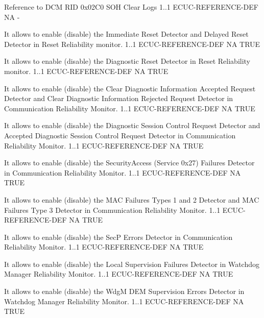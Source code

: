 {
{Reference to DCM RID 0x02C0 SOH Clear Logs}
{1..1}
{ECUC-REFERENCE-DEF}
{NA}
{-}
\label{sec:confparamautosar}

{
{It allows to enable (disable) the Immediate Reset Detector and Delayed Reset Detector in Reset Reliability monitor.}
{1..1}
{ECUC-REFERENCE-DEF}
{NA}
{TRUE}

{
{It allows to enable (disable) the Diagnostic Reset Detector in Reset Reliability monitor.}
{1..1}
{ECUC-REFERENCE-DEF}
{NA}
{TRUE}

{
{It allows to enable (disable) the Clear Diagnostic Information Accepted Request Detector and Clear Diagnostic Information Rejected Request Detector in Communication Reliability Monitor.}
{1..1}
{ECUC-REFERENCE-DEF}
{NA}
{TRUE}

{
{It allows to enable (disable) the Diagnostic Session Control Request Detector and Accepted Diagnostic Session Control Request Detector in Communication Reliability Monitor.}
{1..1}
{ECUC-REFERENCE-DEF}
{NA}
{TRUE}

{
{It allows to enable (disable) the SecurityAccess (Service 0x27) Failures Detector in Communication Reliability Monitor.}
{1..1}
{ECUC-REFERENCE-DEF}
{NA}
{TRUE}

{
{It allows to enable (disable) the MAC Failures Types 1 and 2 Detector and MAC Failures Type 3 Detector in Communication Reliability Monitor.}
{1..1}
{ECUC-REFERENCE-DEF}
{NA}
{TRUE}

{
{It allows to enable (disable) the SecP Errors Detector in Communication Reliability Monitor.}
{1..1}
{ECUC-REFERENCE-DEF}
{NA}
{TRUE}

{
{It allows to enable (disable) the Local Supervision Failures Detector in Watchdog Manager Reliability Monitor. }
{1..1}
{ECUC-REFERENCE-DEF}
{NA}
{TRUE}

{
{It allows to enable (disable) the WdgM DEM Supervision Errors Detector in Watchdog Manager Reliability Monitor.}
{1..1}
{ECUC-REFERENCE-DEF}
{NA}
{TRUE}

}}}}}}}}}}
